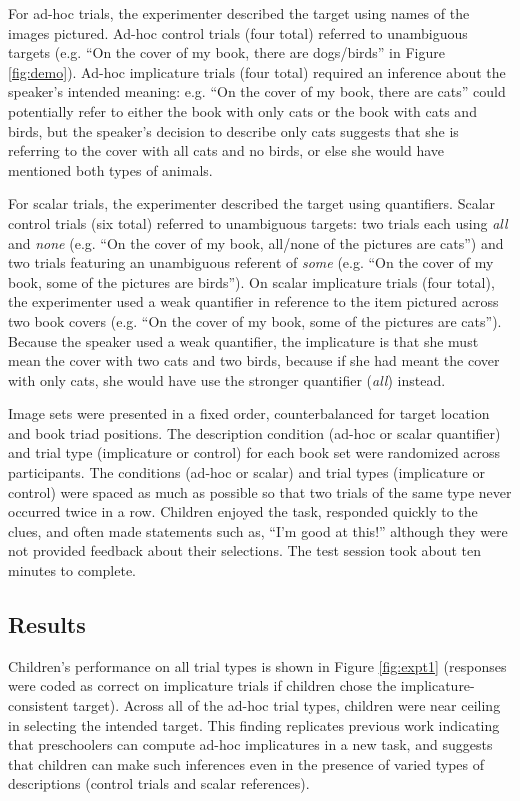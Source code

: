 \documentclass[10pt,letterpaper]{article}
\begin{document}
For ad-hoc trials, the experimenter described the target using names of the images pictured. Ad-hoc control trials (four total) referred to unambiguous targets (e.g. ``On the cover of my book, there are dogs/birds'' in Figure \ref{fig:demo}).  Ad-hoc implicature trials (four total) required an inference about the speaker's intended meaning: e.g. ``On the cover of my book, there are cats'' could potentially refer to either the book with only cats or the book with cats and birds, but the speaker's decision to describe only cats suggests that she is referring to the cover with all cats and no birds, or else she would have mentioned both types of animals. 

For scalar trials, the experimenter described the target using quantifiers. Scalar control trials (six total) referred to unambiguous targets: two trials each using \emph{all} and \emph{none} (e.g. ``On the cover of my book, all/none of the pictures are cats'') and two trials featuring an unambiguous referent of \emph{some} (e.g. ``On the cover of my book, some of the pictures are birds'').  On scalar implicature trials (four total), the experimenter used a weak quantifier in reference to the item pictured across two book covers (e.g. ``On the cover of my book, some of the pictures are cats''). Because the speaker used a weak quantifier, the implicature is that she must mean the cover with two cats and two birds, because if she had meant the cover with only cats, she would have use the stronger quantifier (\emph{all}) instead. 

Image sets were presented in a fixed order, counterbalanced for target location and book triad positions.  The description condition (ad-hoc or scalar quantifier) and trial type (implicature or control) for each book set were randomized across participants. The conditions (ad-hoc or scalar) and trial types (implicature or control) were spaced as much as possible so that two trials of the same type never occurred twice in a row. Children enjoyed the task, responded quickly to the clues, and often made statements such as, ``I'm good at this!'' although they were not provided feedback about their selections. The test session took about ten minutes to complete.

\subsection{Results}

Children's performance on all trial types is shown in Figure \ref{fig:expt1} (responses were coded as correct on implicature trials if children chose the implicature-consistent target). Across all of the ad-hoc trial types, children were near ceiling in selecting the intended target. This finding replicates previous work indicating that preschoolers can compute ad-hoc implicatures \citep{stiller2014} in a new task, and suggests that children can make such inferences even in the presence of varied types of descriptions (control trials and scalar references). 
\end{document}
